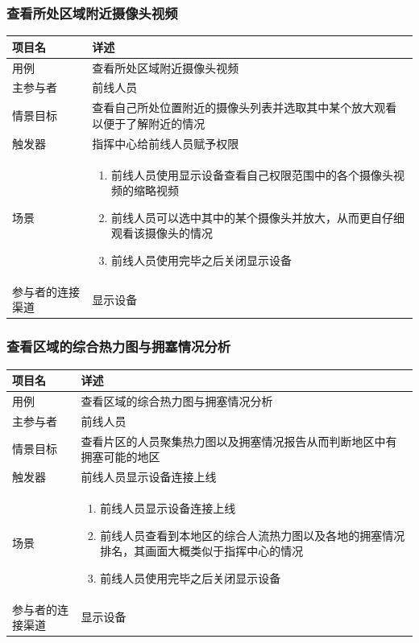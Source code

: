 \documentclass{ctexrep}
\begin{document}
\subsubsection{查看所处区域附近摄像头视频}
\begin{longtable}{p{2cm} | p{10cm}}
\hline
项目名 & 详述 \\
\hline
\hline
用例 & 查看所处区域附近摄像头视频 \\
\hline
主参与者 & 前线人员  \\
\hline
情景目标 & 查看自己所处位置附近的摄像头列表并选取其中某个放大观看以便于了解附近的情况  \\
\hline
触发器 & 指挥中心给前线人员赋予权限 \\
\hline
场景 & \begin{enumerate}
	\item 前线人员使用显示设备查看自己权限范围中的各个摄像头视频的缩略视频
	\item 前线人员可以选中其中的某个摄像头并放大，从而更自仔细观看该摄像头的情况
	\item 前线人员使用完毕之后关闭显示设备
\end{enumerate} \\
\hline
参与者的连接渠道 & 显示设备 \\
\hline
\end{longtable}

\subsubsection{查看区域的综合热力图与拥塞情况分析}
\begin{longtable}{p{2cm} | p{10cm}}
\hline
项目名 & 详述 \\
\hline
\hline
用例 & 查看区域的综合热力图与拥塞情况分析\\
\hline
主参与者 & 前线人员  \\
\hline
情景目标 & 查看片区的人员聚集热力图以及拥塞情况报告从而判断地区中有拥塞可能的地区  \\
\hline
触发器 & 前线人员显示设备连接上线 \\
\hline
场景 & \begin{enumerate}
	\item 前线人员显示设备连接上线
	\item 前线人员查看到本地区的综合人流热力图以及各地的拥塞情况排名，其画面大概类似于指挥中心的情况
	\item 前线人员使用完毕之后关闭显示设备
\end{enumerate} \\
\hline
参与者的连接渠道 & 显示设备 \\
\hline
\end{longtable}
\end{document}

